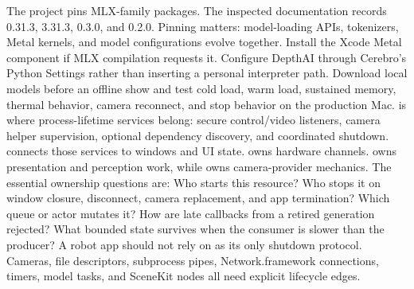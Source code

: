 {}The project pins MLX-family packages. The inspected documentation records  0.31.3,  3.31.3,  0.3.0, and  0.2.0. Pinning matters: model-loading APIs, tokenizers, Metal kernels, and model configurations evolve together.\markdownRendererInterblockSeparator
{}\markdownRendererInterblockSeparator
{}Install the Xcode Metal component if MLX compilation requests it. Configure DepthAI through Cerebro's Python Settings rather than inserting a personal interpreter path. Download local models before an offline show and test cold load, warm load, sustained memory, thermal behavior, camera reconnect, and stop behavior on the production Mac.\markdownRendererInterblockSeparator
{}
\markdownRendererSectionEnd \markdownRendererSectionBegin
{}\markdownRendererInterblockSeparator
{} is where process-lifetime services belong: secure control/video listeners, camera helper supervision, optional dependency discovery, and coordinated shutdown.  connects those services to windows and UI state.  owns hardware channels.  owns presentation and perception work, while  owns camera-provider mechanics.\markdownRendererParagraphSeparator
{}The essential ownership questions are:\markdownRendererInterblockSeparator
{}\markdownRendererOlBegin
{}Who starts this resource?\markdownRendererOlItemEnd 
{}Who stops it on window closure, disconnect, camera replacement, and app termination?\markdownRendererOlItemEnd 
{}Which queue or actor mutates it?\markdownRendererOlItemEnd 
{}How are late callbacks from a retired generation rejected?\markdownRendererOlItemEnd 
{}What bounded state survives when the consumer is slower than the producer?\markdownRendererOlItemEnd 
\markdownRendererOlEnd \markdownRendererInterblockSeparator
{}A robot app should not rely on  as its only shutdown protocol. Cameras, file descriptors, subprocess pipes, Network.framework connections, timers, model tasks, and SceneKit nodes all need explicit lifecycle edges.\markdownRendererInterblockSeparator
